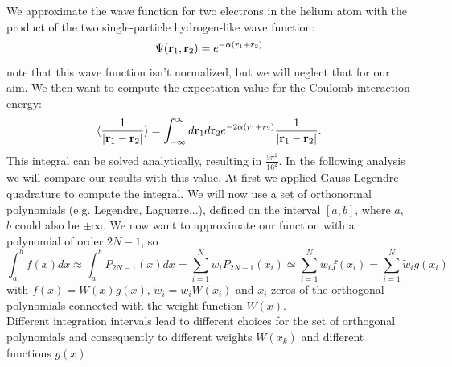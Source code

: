 \documentclass[10pt,a4paper,titlepage]{article}
\begin{document}
We approximate the wave function for two electrons in the helium atom with the product of the two single-particle hydrogen-like wave function:
\begin{equation}
\Psi({\bf r}_1,{\bf r}_2) = e^{-\alpha (r_1+r_2)}
\end{equation}
note that this wave function isn't normalized, but we will neglect that for our aim. 
We then want to compute the expectation value for the Coulomb interaction energy:
\begin{equation}\label{eq:correlationenergy}
   \langle \frac{1}{|{\bf r}_1-{\bf r}_2|} \rangle =
   \int_{-\infty}^{\infty} d{\bf r}_1d{\bf r}_2  e^{-2\alpha (r_1+r_2)}\frac{1}{|{\bf r}_1-{\bf r}_2|}.
\end{equation}
This integral can be solved analytically, resulting in $\frac{5\pi^{2}}{16^{2}}$. In the following analysis we will compare our results with this value.
At first we applied Gauss-Legendre quadrature to compute the integral. 
We will now use a set of orthonormal polynomials (e.g. Legendre, Laguerre...), defined on the interval $[a,b]$, where $a$, $b$ could also be $\pm \infty$. We now want to approximate our function with a polynomial of order $2N-1$, so
\begin{equation} 
\int_{a}^{b}f(x)dx \approx \int_{a}^{b}P_{2N-1}(x)dx = \sum_{i=1}^{N} w_i P_{2N-1}(x_i) \simeq \sum_{i=1}^{N} w_i f(x_i)=\sum_{i=1}^{N} \tilde{w}_i g(x_i)
\end{equation}
with $f(x)=W(x)g(x)$, $\tilde{w}_i =w_i W(x_i)$ and $x_i$ zeros of the orthogonal polynomials connected with the weight function $W(x)$.
\\Different integration intervals lead to different choices for the set of orthogonal polynomials and consequently to different weights $W(x_{k})$ and different functions $g(x)$.
\end{document}
